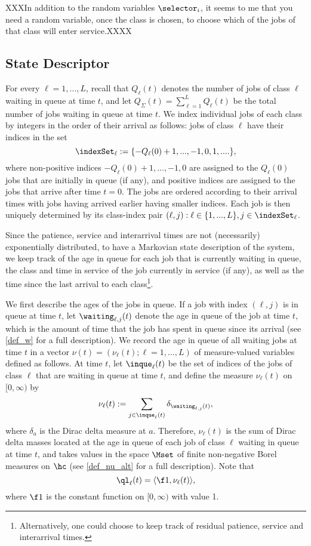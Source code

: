 \documentclass{article}
\begin{document}
XXXIn addition to the random variables $\selector_i$, it seems to me that you need a random variable, once the class is chosen,  to choose which of the jobs of that class will enter service.XXXX



\subsection{State Descriptor} \label{sec_state}
For every $\ell=1,...,L$, recall that $Q_\ell(t)$ denotes the number of jobs of class $\ell$ waiting in queue at time $t$, and let $Q_\Sigma(t)=\sum_{\ell=1}^LQ_\ell(t)$ be the total number of jobs waiting in queue at time $t$. We index individual jobs of each class by integers in the order of their arrival as follows: jobs of class $\ell$ have their indices in the set
\[
\indexSet_\ell := \{-Q_\ell(0)+1,...,-1,0,1,....\},
\]
where non-positive indices $-Q_\ell(0)+1,...,-1,0$ are assigned to the $Q_\ell(0)$ jobs that are initially in queue (if any), and positive indices are assigned to the jobs that arrive after time $t=0$. The jobs are ordered according to their arrival times with jobs having arrived earlier having smaller indices. Each job is then uniquely determined by its class-index pair $(\ell,j): \ell\in\{1,...,L\}, j\in\indexSet_\ell$.

Since the patience, service  and interarrival times are not (necessarily) exponentially distributed, to have a Markovian state description of the system, we keep track of the age in queue for each job that is currently waiting in queue, the class and   time in service  of the job currently in  service (if any), as well as the time since the last arrival to each class\footnote{Alternatively, one could choose to keep track of residual patience, service and interarrival times.}. 

We first describe the ages of the jobs in queue.
If a job with index $(\ell,j)$ is in queue at time $t$,  let $\waiting_{\ell,j}(t)$ denote the age in queue of the job at time $t$, which is the amount of time that the job has spent in queue since its arrival (see \eqref{def_w} for a full description). We record the age in queue of all waiting jobs at time $t$ in a vector $\nu(t)=(\nu_\ell(t);\ell=1,...,L)$ of measure-valued variables defined as follows. At time $t$, let $\inque_\ell(t)$ be the set of indices of the jobs of class $\ell$ that are waiting in queue at time $t$,  and define the measure $\nu_\ell(t)$ on $[0,\infty)$ by
\begin{equation}\label{def_nuk_early}
  \nu_\ell(t):= \sum_{j\in\inque_\ell(t)}\delta_{\waiting_{\ell,j}(t)},
\end{equation}
where $\delta_a$ is the Dirac delta measure at $a$. Therefore, $\nu_\ell(t)$ is the sum of Dirac delta masses located at the age in queue of each job of class $\ell$ waiting in queue at time $t$, and takes values in the space $\Mset$ of finite non-negative Borel measures on $\hc$ (see \eqref{def_nu_alt} for a full description).  Note that 
\begin{equation}
  \ql_\ell(t)=\langle\f1,\nu_\ell(t)\rangle,
\end{equation}
where $\f1$ is the constant function on $[0,\infty)$ with value 1.
\end{document}

